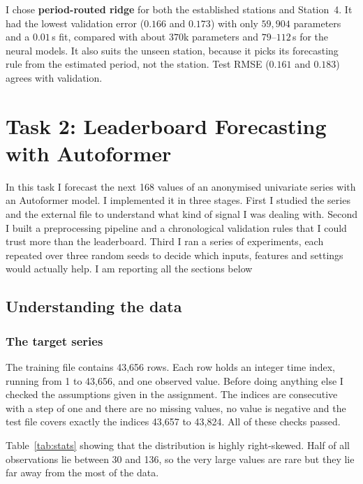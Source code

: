 \documentclass[a4, 12pt]{article}
\begin{document}
I chose \textbf{period-routed ridge} for both the established stations and
Station~4. It had the lowest validation error ($0.166$ and $0.173$) with only
$59{,}904$ parameters and a $0.01$\,s fit, compared with about $370$k parameters
and $79$--$112$\,s for the neural models. It also suits the unseen station,
because it picks its forecasting rule from the estimated period, not the
station. Test RMSE ($0.161$ and $0.183$) agrees with validation.


\section{Task 2: Leaderboard Forecasting with Autoformer}

In this task I forecast the next 168 values of an anonymised univariate series with an Autoformer model. I implemented it in three stages. First I studied the series and the external file to understand what kind of signal I was dealing with. Second I built a preprocessing pipeline and a chronological validation rules that I could trust more than the leaderboard. Third I ran a series of experiments, each repeated over three random seeds to decide which inputs, features and settings would actually help. I am reporting all the sections below

\subsection{Understanding the data}

\subsubsection{The target series}

The training file contains 43,656 rows. Each row holds an integer time index, running from 1 to 43,656, and one observed value. Before doing anything else I checked the assumptions given in the assignment. The indices are consecutive with a step of one and there are no missing values, no value is negative and the test file covers exactly the indices 43,657 to 43,824. All of these checks passed.

Table~\ref{tab:stats} showing that the distribution is highly right-skewed. Half of all observations lie between 30 and 136, so the very large values are rare but they lie far away from the most of the data.
\end{document}
